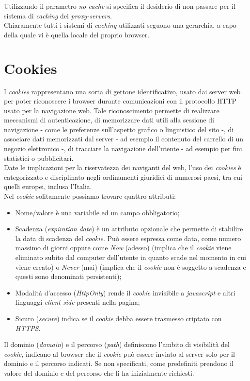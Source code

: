 Utilizzando il parametro \textit{no-cache} si specifica il desiderio di non passare per il sistema di \textit{caching} dei \textit{proxy-servers}. \\
Chiaramente tutti i sistemi di \textit{caching} utilizzati seguono una gerarchia, a capo della quale vi è quella locale del proprio browser.

\section{Cookies}
I \textit{cookies} rappresentano una sorta di gettone identificativo, usato dai server web per poter riconoscere i browser durante comunicazioni con il protocollo HTTP usato per la navigazione web.
Tale riconoscimento permette di realizzare meccanismi di autenticazione, di memorizzare dati utili alla sessione di navigazione - come le preferenze sull'aspetto grafico o linguistico del sito -, di associare dati memorizzati dal server - ad esempio il contenuto del carrello di un negozio elettronico -, di tracciare la navigazione dell'utente - ad esempio per fini statistici o pubblicitari. \\
Date le implicazioni per la riservatezza dei naviganti del web, l'uso dei \textit{cookies} è categorizzato e disciplinato negli ordinamenti giuridici di numerosi paesi, tra cui quelli europei, inclusa l'Italia. \\
Nel \textit{cookie} solitamente possiamo trovare quattro attributi:
\begin{itemize}
    \item Nome/valore è una variabile ed un campo obbligatorio;
    \item Scadenza (\textit{expiration date}) è un attributo opzionale che permette di stabilire la data di scadenza del \textit{cookie}. Può essere espressa come data, come numero massimo di giorni oppure come \textit{Now} (adesso) (implica che il \textit{cookie} viene eliminato subito dal computer dell'utente in quanto scade nel momento in cui viene creato) o \textit{Never} (mai) (implica che il \textit{cookie} non è soggetto a scadenza e questi sono denominati persistenti);
    \item Modalità d'accesso (\textit{HttpOnly}) rende il \textit{cookie} invisibile a \textit{javascript} e altri linguaggi \textit{client-side} presenti nella pagina;
    \item Sicuro (\textit{secure}) indica se il \textit{cookie} debba essere trasmesso criptato con \textit{HTTPS}.
\end{itemize}
Il dominio (\textit{domain}) e il percorso (\textit{path}) definiscono l'ambito di visibilità del \textit{cookie}, indicano al browser che il \textit{cookie} può essere inviato al server solo per il dominio e il percorso indicati. Se non specificati, come predefiniti prendono il valore del dominio e del percorso che li ha inizialmente richiesti. \\
\newpage

